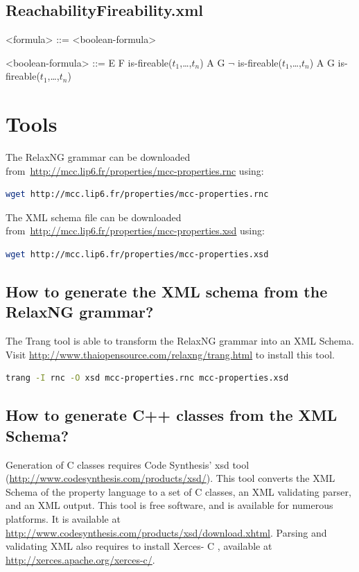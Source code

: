 \documentclass[10pt,english,a4paper]{article}
\newcommand{\CC}{%
  C\nolinebreak\hspace{-.05em}\raisebox{.4ex}{\scriptsize\bf +}\nolinebreak\hspace{-.10em}\raisebox{.4ex}{\scriptsize\bf +}%
}
\begin{document}
\subsection{ReachabilityFireability.xml}

\begin{grammar}

<formula> ::= <boolean-formula>

<boolean-formula> ::= E F is-fireable($t_1$,\dots,$t_n$)
\alt A G $\lnot$ is-fireable($t_1$,\dots,$t_n$)
\alt A G is-fireable($t_1$,\dots,$t_n$)

\end{grammar}


\clearpage
\section{Tools}
The RelaxNG grammar can be downloaded from~\url{http://mcc.lip6.fr/properties/mcc-properties.rnc} using:
\begin{lstlisting}[language=sh]
  wget http://mcc.lip6.fr/properties/mcc-properties.rnc
\end{lstlisting}

The XML schema file can be downloaded from~\url{http://mcc.lip6.fr/properties/mcc-properties.xsd} using:
\begin{lstlisting}[language=sh]
  wget http://mcc.lip6.fr/properties/mcc-properties.xsd
\end{lstlisting}

\subsection{How to generate the XML schema from the RelaxNG grammar?}
The Trang tool is able to transform the RelaxNG grammar into an XML Schema.
Visit \url{http://www.thaiopensource.com/relaxng/trang.html} to install this tool.

\begin{lstlisting}[language=sh]
  trang -I rnc -O xsd mcc-properties.rnc mcc-properties.xsd
\end{lstlisting}

\subsection{How to generate C++ classes from the XML Schema?}
Generation of {\CC} classes requires Code Synthesis' xsd tool
(\url{http://www.codesynthesis.com/products/xsd/}).
This tool converts the XML Schema of the property language to a set of \CC{} classes,
an XML validating parser, and an XML output.
This tool is free software, and is available for numerous platforms.
It is available at \url{http://www.codesynthesis.com/products/xsd/download.xhtml}.
Parsing and validating XML also requires to install Xerces-\CC{},
available at \url{http://xerces.apache.org/xerces-c/}.
\end{document}

